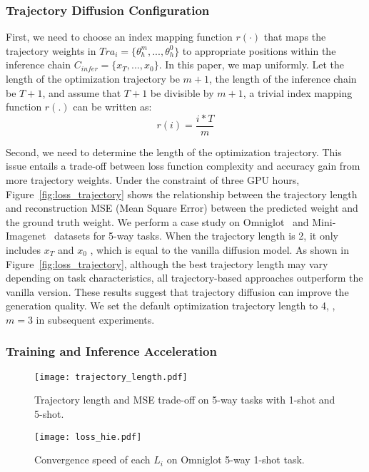 \subsubsection{Trajectory Diffusion Configuration}\label{sec:Trajectory Selection}
First, we need to choose an index mapping function $r(\cdot)$ that maps the trajectory weights in $Tra_i=\{\theta_h^m, ... ,\theta_h^0\}$ to appropriate positions within the inference chain $C_{infer}=\{x_T,...,x_0\}$. In this paper, we map uniformly. Let the length of the optimization trajectory be $m+1$, the length of the inference chain be $T+1$, and assume that $T+1$ be divisible by $m+1$, a trivial index mapping function $r(.)$ can be written as:
\begin{equation}\label{eq:map index}
    r(i)=\frac{i*T}{m}
\end{equation}

Second, we need to determine the length of the optimization trajectory. This issue entails a trade-off between loss function complexity and accuracy gain from more trajectory weights. Under the constraint of three GPU hours, Figure~\ref{fig:loss_trajectory} shows the relationship between the trajectory length and reconstruction MSE (Mean Square Error) between the predicted weight and the ground truth weight. We perform a case study on Omniglot~\cite{omniglot} and Mini-Imagenet~\cite{miniImagenet} datasets for 5-way tasks. When the trajectory length is 2, it only includes $x_T$ and $x_0$ , which is equal to the vanilla diffusion model. As shown in Figure~\ref{fig:loss_trajectory}, although the best trajectory length may vary depending on task characteristics, all trajectory-based approaches outperform the vanilla version. These results suggest that trajectory diffusion can improve the generation quality. We set the default optimization trajectory length to 4, \ie, $m=3$ in subsequent experiments.

\subsubsection{Training and Inference Acceleration}\label{sec:discuss acceleration}

\begin{figure}[t]
    \centering
    \begin{minipage}[t]{0.47\linewidth}
        \centering
        \texttt{[image: trajectory\_length.pdf]}
        \caption{Trajectory length and MSE trade-off on 5-way tasks with 1-shot and 5-shot.}
        \label{fig:loss_trajectory}
    \end{minipage}
    \hspace{0.03\linewidth}
    \begin{minipage}[t]{0.47\linewidth}
        \centering
        \texttt{[image: loss\_hie.pdf]}
        \caption{Convergence speed of each $L_i$ on Omniglot 5-way 1-shot task.}
        \label{fig:loss_hie}
    \end{minipage}
\end{figure}

